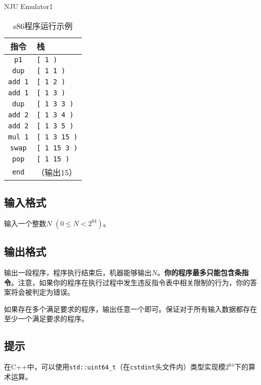 \begin{Problem}{NJU Emulator}{1}
\begin{table}[htbp]
\centering
\begin{tabular}{cl}
\hline
指令 & 栈  \\ \hline
\texttt{p1} & \texttt{[ 1 )} \\ 
\texttt{dup} & \texttt{[ 1 1 )} \\
\texttt{add 1} & \texttt{[ 1 2 )} \\
\texttt{add 1} & \texttt{[ 1 3 )} \\
\texttt{dup} & \texttt{[ 1 3 3 )} \\
\texttt{add 2} & \texttt{[ 1 3 4 )} \\
\texttt{add 2} & \texttt{[ 1 3 5 )} \\
\texttt{mul 1} & \texttt{[ 1 3 15 )} \\
\texttt{swap} & \texttt{[ 1 15 3 )} \\
\texttt{pop} & \texttt{[ 1 15 )} \\
\texttt{end} & （输出15） \\ \hline
\end{tabular}
\caption{s86程序运行示例}
\end{table}

\subsection*{输入格式}

输入一个整数$N$ $(0 \leq N < 2^{64})$。

\subsection*{输出格式}

输出一段程序，程序执行结束后，机器能够输出$N$。\textbf{你的程序最多只能包含条指令}。注意，如果你的程序在执行过程中发生违反指令表中相关限制的行为，你的答案将会被判定为错误。

如果存在多个满足要求的程序，输出任意一个即可。保证对于所有输入数据都存在至少一个满足要求的程序。

\setcounter{ExampleNo}{0}


\subsection*{提示}

在C++中，可以使用\verb|std::uint64_t|（在\texttt{cstdint}头文件内）类型实现模$2^{64}$下的算术运算。

\end{Problem}

